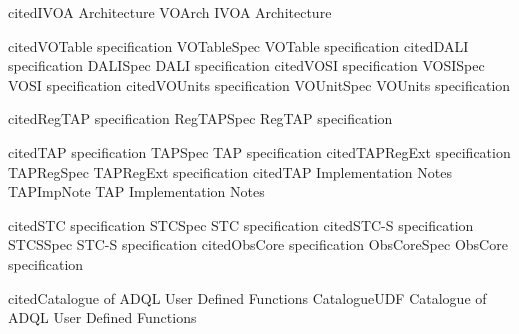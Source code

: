 %
%
%

\def\definestandard#1#2#3{%
  \expandafter\def\csname#1\endcsname{%
    \expandafter\ifx\csname#1cited\endcsname\relax #3 \citep{#2}%
    \expandafter\def\csname#1cited\endcsname{#1}%
      \else #3\fi}}

\definestandard{VOArch}       {2010ivoa.rept.1123A} {IVOA Architecture}

\definestandard{VOTableSpec}  {2013ivoa.spec.0920O} {VOTable specification}
\definestandard{DALISpec}     {2017ivoa.spec.0517D} {DALI specification}
\definestandard{VOSISpec}     {2017ivoa.spec.0524G} {VOSI specification}
\definestandard{VOUnitSpec}   {2014ivoa.spec.0523D} {VOUnits specification}

\definestandard{RegTAPSpec}   {2014ivoa.spec.1208D} {RegTAP specification}

\definestandard{TAPSpec}      {2010ivoa.spec.0327D} {TAP specification}
\definestandard{TAPRegSpec}   {2012ivoa.spec.0827D} {TAPRegExt specification}
\definestandard{TAPImpNote}   {2013ivoa.rept.1213D} {TAP Implementation Notes}

\definestandard{STCSpec}      {2007ivoa.spec.1030R} {STC specification}
\definestandard{STCSSpec}     {std:STCS}            {STC-S specification}
\definestandard{ObsCoreSpec}  {2017ivoa.spec.0509L} {ObsCore specification}

\definestandard{CatalogueUDF} {2021ivoa.spec.0310C} {Catalogue of ADQL User Defined Functions}

%
\newcommand{\FigureRef}[1]{Figure \ref{#1}}
\newcommand{\SectionRef}[1]{Section \ref{#1}}
\newcommand{\SectionSee}[1]{(see Section \ref{#1})}
\newcommand{\AppendixRef}[1]{Appendix \ref{#1}}
